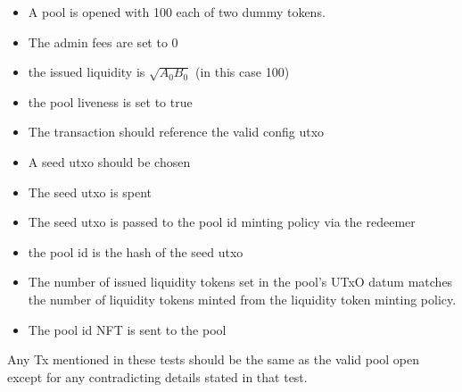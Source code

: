 \documentclass{article}
\begin{document}
\begin{itemize}
	\item A pool is opened with 100 each of two dummy tokens.
	\item The admin fees are set to 0
	\item the issued liquidity is $\sqrt{A_0 B_0}$ (in this case 100)
	\item the pool liveness is set to true
	\item The transaction should reference the valid config utxo
	\item A seed utxo should be chosen
	\item The seed utxo is spent
	\item The seed utxo is passed to the pool id minting policy via the redeemer
	\item the pool id is the hash of the seed utxo
	\item The number of issued liquidity tokens set in the pool's UTxO datum matches the number of liquidity tokens minted from the liquidity token minting policy.
	\item The pool id NFT is sent to the pool
\end{itemize}

Any Tx mentioned in these tests should be the same as the valid pool open
except for any contradicting details stated in that test.
\end{document}
